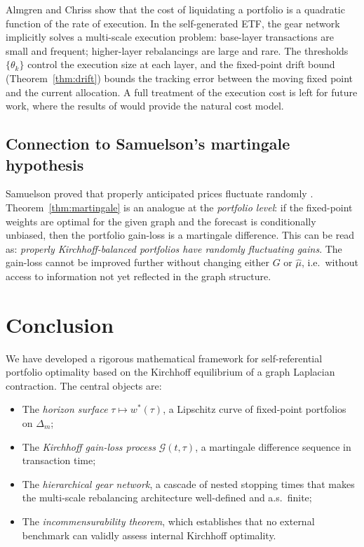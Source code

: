 \documentclass[twocolumn,11pt,a4paper]{article}
\theoremstyle{plain}
\theoremstyle{definition}
\theoremstyle{remark}
\newcommand{\wstar}{w^{*}}
\newcommand{\Deltam}{\Delta_m}
\newcommand{\Gain}{\mathcal{G}}
\begin{document}
Almgren and Chriss \cite{AlmgrenChriss2001} show that the cost of
liquidating a portfolio is a quadratic function of the rate of
execution.  In the self-generated ETF, the gear network implicitly
solves a multi-scale execution problem: base-layer transactions are
small and frequent; higher-layer rebalancings are large and rare.
The thresholds $\{\theta_k\}$ control the execution size at each
layer, and the fixed-point drift bound (Theorem~\ref{thm:drift})
bounds the tracking error between the moving fixed point and the
current allocation.  A full treatment of the execution cost is
left for future work, where the results of \cite{AlmgrenChriss2001}
would provide the natural cost model.

\subsection{Connection to Samuelson's martingale hypothesis}
\label{sec:discussion_samuelson}

Samuelson proved that properly anticipated prices fluctuate randomly
\cite{Samuelson1965}.  Theorem~\ref{thm:martingale} is an analogue
at the \emph{portfolio level}: if the fixed-point weights are optimal
for the given graph and the forecast is conditionally unbiased, then
the portfolio gain-loss is a martingale difference.  This can be read
as: \emph{properly Kirchhoff-balanced portfolios have randomly
fluctuating gains}.  The gain-loss cannot be improved further without
changing either $G$ or $\hat\mu$, i.e.~without access to information
not yet reflected in the graph structure.

\section{Conclusion}
\label{sec:conclusion}

We have developed a rigorous mathematical framework for self-referential
portfolio optimality based on the Kirchhoff equilibrium of a graph
Laplacian contraction.  The central objects are:

\begin{itemize}
  \item The \emph{horizon surface} $\tau\mapsto\wstar(\tau)$, a
        Lipschitz curve of fixed-point portfolios on $\Deltam$;
  \item The \emph{Kirchhoff gain-loss process} $\Gain(t,\tau)$, a
        martingale difference sequence in transaction time;
  \item The \emph{hierarchical gear network}, a cascade of nested
        stopping times that makes the multi-scale rebalancing
        architecture well-defined and a.s.~finite;
  \item The \emph{incommensurability theorem}, which establishes
        that no external benchmark can validly assess internal
        Kirchhoff optimality.
\end{itemize}
\end{document}
